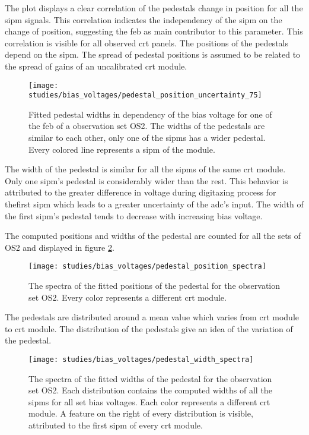 The plot displays a clear correlation of the pedestals change in position for all the \gls{sipm} signals.
This correlation indicates the independency of the \gls{sipm} on the change of position, suggesting the \gls{feb} as main contributor to this parameter.
This correlation is visible for all observed \gls{crt} panels.
The positions of the pedestals depend on the \gls{sipm}.
The spread of pedestal positions is assumed to be related to the spread of gains of an uncalibrated \gls{crt} module.

\begin{figure}
  \texttt{[image: studies/bias\_voltages/pedestal\_position\_uncertainty\_75]}
  \caption{%
    Fitted pedestal widths in dependency of the bias voltage for one of the \gls{feb} of a observation set OS2.
    The widths of the pedestals are similar to each other, only one of the \glspl{sipm} has a wider pedestal.
    Every colored line represents a \gls{sipm} of the module.
  }
  \label{fig:pedestal_wid_bias}
\end{figure}

The width of the pedestal is similar for all the \glspl{sipm} of the same \gls{crt} module.
Only one \gls{sipm}'s pedestal is considerably wider than the rest.
This behavior is attributed to the greater difference in voltage during digitazing process for thefirst \gls{sipm} which leads to a greater uncertainty of the \gls{adc}'s input.
The width of the first \gls{sipm}'s pedestal tends to decrease with increasing bias voltage.

The computed positions and widths of the pedestal are counted for all the sets of OS2 and displayed in figure \ref{fig:pedestal_pos_spectra_bias}.

\begin{figure}
  \centering
  \texttt{[image: studies/bias\_voltages/pedestal\_position\_spectra]}
  \caption{
    The spectra of the fitted positions of the pedestal for the observation set OS2.
    Every color represents a different \gls{crt} module.
  }
  \label{fig:pedestal_pos_spectra_bias}
\end{figure}

The pedestals are distributed around a mean value which varies from \gls{crt} module to \gls{crt} module.
The distribution of the pedestals give an idea of the variation of the pedestal.

\begin{figure}
  \texttt{[image: studies/bias\_voltages/pedestal\_width\_spectra]}
  \caption{
    The spectra of the fitted widths of the pedestal for the observation set OS2.
    Each distribution contains the computed widths of all the \glspl{sipm} for all set bias voltages.
    Each color represents a different \gls{crt} module.
    A feature on the right of every distribution is visible, attributed to the first \gls{sipm} of every \gls{crt} module.
  }
  \label{fig:pedestal_wid_spectra_bias}
\end{figure}

